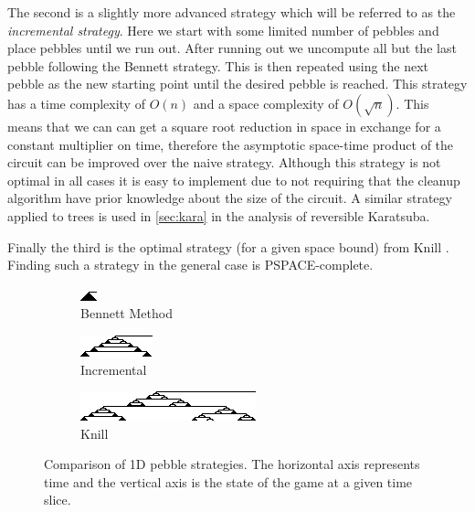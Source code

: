 The second is a slightly more advanced strategy which will be referred to as
the \emph{incremental strategy}. Here we start with some limited number of
pebbles and place pebbles until we run out. After running out we uncompute all
but the last pebble following the Bennett strategy. This is then repeated using
the next pebble as the new starting point until the desired pebble is reached.
This strategy has a time complexity of $O(n)$ and a space complexity of
$O(\sqrt n)$. This means that we can can get a square root reduction in space
in exchange for a constant multiplier on time, therefore the asymptotic
space-time product of the circuit can be improved over the naive strategy.
Although this strategy is not optimal in all cases it is easy to implement due
to not requiring that the cleanup algorithm have prior knowledge about the size
of the circuit. A similar strategy applied to trees is used in \cref{sec:kara}
in the analysis of reversible Karatsuba.

Finally the third is the optimal strategy (for a given space bound) from Knill
\cite{knill:95}. Finding such a strategy in the general case is
PSPACE-complete.  



\begin{figure}
  \centering
  \begin{subfigure}{0.3\textwidth}
    \centering
    \includegraphics{images/Pebble1.png}
    \caption{Bennett Method}
  \end{subfigure}
  \begin{subfigure}{0.3\textwidth}
    \centering
    \includegraphics{images/Pebble2.png}
    \caption{Incremental}
  \end{subfigure}\begin{subfigure}{0.3\textwidth}
    \centering
    \includegraphics{images/Pebble3.png}
    \caption{Knill}
  \end{subfigure}
  \label{fig:pebble}
  \caption{Comparison of 1D pebble strategies. The horizontal axis represents
  time and the vertical axis is the state of the game at a given time slice.}
\end{figure}

